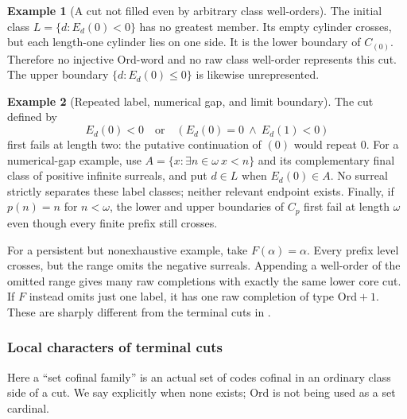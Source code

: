 \documentclass[11pt]{article}
\theoremstyle{definition}
\newtheorem{example}[example]{Example}
\theoremstyle{remark}
\newcommand{\Ord}{\mathrm{Ord}}
\begin{document}
\begin{example}[A cut not filled even by arbitrary class well-orders]\label{swo:cb:ex:firstlabelcut}
The initial class $L=\{d:E_d(0)<0\}$ has no greatest member. Its
empty cylinder crosses, but each length-one cylinder lies on one side.
It is the lower boundary of $C_{(0)}$. Therefore no injective
$\Ord$-word and no raw class well-order represents this cut.
The upper boundary $\{d:E_d(0)\leq0\}$ is likewise unrepresented.
\end{example}

\begin{example}[Repeated label, numerical gap, and limit boundary]\label{swo:cb:n7.7}
The cut defined by
\[
 E_d(0)<0\quad\text{or}\quad(E_d(0)=0\ \land\ E_d(1)<0)
\]
first fails at length two: the putative continuation of $(0)$ would
repeat $0$. For a numerical-gap example, use
$A=\{x:\exists n\in\omega\ x<n\}$ and its complementary final class
of positive infinite surreals, and put $d\in L$ when $E_d(0)\in A$.
No surreal strictly separates these label classes; neither relevant
endpoint exists. Finally, if $p(n)=n$ for $n<\omega$, the lower and
upper boundaries of $C_p$ first fail at length $\omega$ even though
every finite prefix still crosses.
\end{example}

For a persistent but nonexhaustive example, take $F(\alpha)=\alpha$.
Every prefix level crosses, but the range omits the negative surreals.
Appending a well-order of the omitted range gives many raw completions
with exactly the same lower core cut. If $F$ instead omits just one
label, it has one raw completion of type $\Ord+1$. These are sharply
different from the terminal cuts in .

\subsubsection{Local characters of terminal cuts}

Here a ``set cofinal family'' is an actual set of codes cofinal in an
ordinary class side of a cut. We say explicitly when none exists;
$\Ord$ is not being used as a set cardinal.
\end{document}

